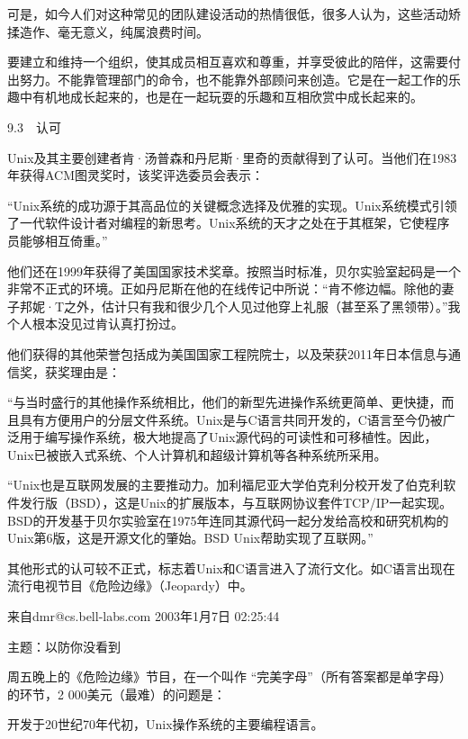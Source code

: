 \documentclass[a4paper,12pt,UTF8,twoside]{ctexbook}
\begin{document}
可是，如今人们对这种常见的团队建设活动的热情很低，很多人认为，这些活动矫揉造作、毫无意义，纯属浪费时间。

要建立和维持一个组织，使其成员相互喜欢和尊重，并享受彼此的陪伴，这需要付出努力。不能靠管理部门的命令，也不能靠外部顾问来创造。它是在一起工作的乐趣中有机地成长起来的，也是在一起玩耍的乐趣和互相欣赏中成长起来的。





9.3　认可


Unix及其主要创建者肯·汤普森和丹尼斯·里奇的贡献得到了认可。当他们在1983年获得ACM图灵奖时，该奖评选委员会表示：

“Unix系统的成功源于其高品位的关键概念选择及优雅的实现。Unix系统模式引领了一代软件设计者对编程的新思考。Unix系统的天才之处在于其框架，它使程序员能够相互倚重。”



他们还在1999年获得了美国国家技术奖章。按照当时标准，贝尔实验室起码是一个非常不正式的环境。正如丹尼斯在他的在线传记中所说：“肯不修边幅。除他的妻子邦妮·T之外，估计只有我和很少几个人见过他穿上礼服（甚至系了黑领带）。”我个人根本没见过肯认真打扮过。

他们获得的其他荣誉包括成为美国国家工程院院士，以及荣获2011年日本信息与通信奖，获奖理由是：

“与当时盛行的其他操作系统相比，他们的新型先进操作系统更简单、更快捷，而且具有方便用户的分层文件系统。Unix是与C语言共同开发的，C语言至今仍被广泛用于编写操作系统，极大地提高了Unix源代码的可读性和可移植性。因此，Unix已被嵌入式系统、个人计算机和超级计算机等各种系统所采用。

“Unix也是互联网发展的主要推动力。加利福尼亚大学伯克利分校开发了伯克利软件发行版（BSD），这是Unix的扩展版本，与互联网协议套件TCP/IP一起实现。BSD的开发基于贝尔实验室在1975年连同其源代码一起分发给高校和研究机构的Unix第6版，这是开源文化的肇始。BSD Unix帮助实现了互联网。”



其他形式的认可较不正式，标志着Unix和C语言进入了流行文化。如C语言出现在流行电视节目《危险边缘》（Jeopardy）中。



来自dmr@cs.bell-labs.com 2003年1月7日 02:25:44

主题：以防你没看到

周五晚上的《危险边缘》节目，在一个叫作 “完美字母”（所有答案都是单字母）的环节，2 000美元（最难）的问题是：

开发于20世纪70年代初，Unix操作系统的主要编程语言。
\end{document}
